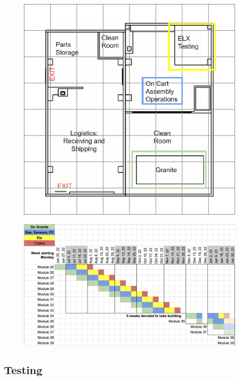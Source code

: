 \begin{frame}
\begin{minipage}{0.4\pdfpagewidth}
\begin{figure}
					\includegraphics[width=0.4\pdfpagewidth]{test.pdf}
				\end{figure}
			\end{minipage}
		\end{frame}
		\begin{frame}{\ph}
			\begin{figure}[t]
				\centering
				\includegraphics[width=0.8\pdfpagewidth]{Chamber Production.png}		
				\label{fig:ChamberProduction}		
			\end{figure}
		\end{frame}
	\subsection{Testing}

